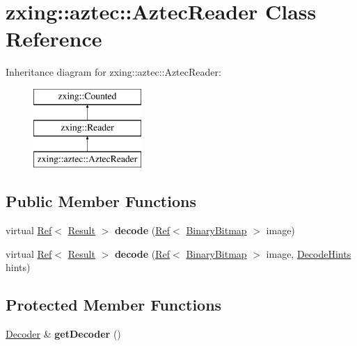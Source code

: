 \hypertarget{classzxing_1_1aztec_1_1_aztec_reader}{}\section{zxing\+:\+:aztec\+:\+:Aztec\+Reader Class Reference}
\label{classzxing_1_1aztec_1_1_aztec_reader}
Inheritance diagram for zxing\+:\+:aztec\+:\+:Aztec\+Reader\+:\begin{figure}[H]
\begin{center}
\leavevmode
\includegraphics[height=3.000000cm]{classzxing_1_1aztec_1_1_aztec_reader}
\end{center}
\end{figure}
\subsection*{Public Member Functions}
\begin{DoxyCompactItemize}
\item 
\mbox{\label{classzxing_1_1aztec_1_1_aztec_reader_aa893fc0f3eb90755b29c311de8d600e9}} 
virtual \mbox{\hyperlink{classzxing_1_1_ref}{Ref}}$<$ \mbox{\hyperlink{classzxing_1_1_result}{Result}} $>$ {\bfseries decode} (\mbox{\hyperlink{classzxing_1_1_ref}{Ref}}$<$ \mbox{\hyperlink{classzxing_1_1_binary_bitmap}{Binary\+Bitmap}} $>$ image)
\item 
\mbox{\label{classzxing_1_1aztec_1_1_aztec_reader_a66dd0b1e1842b3784ec3bb88aae155b7}} 
virtual \mbox{\hyperlink{classzxing_1_1_ref}{Ref}}$<$ \mbox{\hyperlink{classzxing_1_1_result}{Result}} $>$ {\bfseries decode} (\mbox{\hyperlink{classzxing_1_1_ref}{Ref}}$<$ \mbox{\hyperlink{classzxing_1_1_binary_bitmap}{Binary\+Bitmap}} $>$ image, \mbox{\hyperlink{classzxing_1_1_decode_hints}{Decode\+Hints}} hints)
\end{DoxyCompactItemize}
\subsection*{Protected Member Functions}
\begin{DoxyCompactItemize}
\item 
\mbox{\label{classzxing_1_1aztec_1_1_aztec_reader_aa5bb61ac858502e4c2c9d2ec05ef848f}} 
\mbox{\hyperlink{classzxing_1_1aztec_1_1_decoder}{Decoder}} \& {\bfseries get\+Decoder} ()
\end{DoxyCompactItemize}


